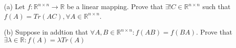 (a) Let $f: \mathbb{R}^{n\times n}\rightarrow\mathbb{R}$ be a linear mapping. Prove that $\exists ! C\in\mathbb{R}^{n\times n}$ such that $f(A)=Tr(AC), \forall A \in \mathbb{R}^{n\times n}$.

(b) Suppose in addtion that $\forall A,B \in \mathbb{R}^{n\times n}: f(AB)=f(BA)$. Prove that $\exists \lambda \in \mathbb{R}: f(A)=\lambda Tr(A)$